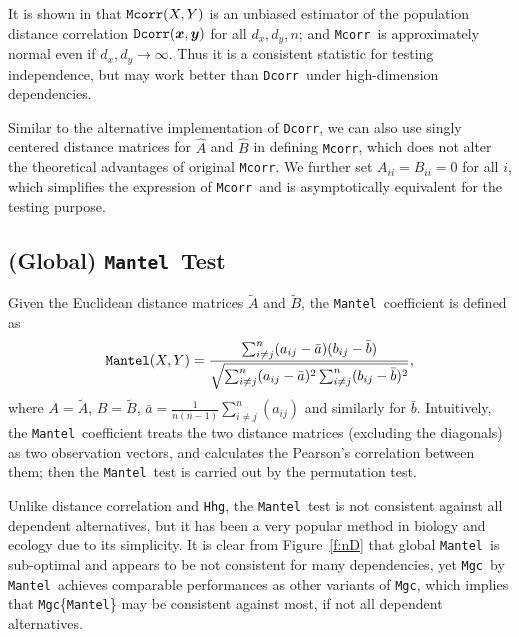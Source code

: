 \documentclass[11pt]{article}
\providecommand{\sct}[1]{{\sc \texttt{#1}}}
\providecommand{\mb}[1]{\boldsymbol{#1}}
\newcommand{\Mgc}{\sct{Mgc}}
\newcommand{\Hhg}{\sct{Hhg}}
\newcommand{\Dcorr}{\sct{Dcorr}}
\newcommand{\Mcorr}{\sct{Mcorr}}
\newcommand{\Mantel}{\sct{Mantel}}
\begin{document}
It is shown in \cite{SzekelyRizzo2013a} that $\Mcorr(X,Y)$ is an unbiased estimator of the population distance correlation $\Dcorr(\mb{x},\mb{y})$ for all $d_{x}, d_{y}, n$; and \Mcorr~is approximately normal even if $d_{x},d_{y} \rightarrow \infty$. Thus it is a consistent statistic for testing independence, but may work better than \Dcorr~under high-dimension dependencies. 

Similar to the alternative implementation of \Dcorr, we can also use singly centered distance matrices for $\hat{A}$ and $\hat{B}$ in defining \Mcorr, which does not alter the theoretical advantages of original \Mcorr. We further set $A_{ii}=B_{ii}=0$ for all $i$, which simplifies the expression of \Mcorr~and is asymptotically equivalent for the testing purpose. %

\subsection{(Global) \Mantel~Test}
\label{appen:mantel}
Given the Euclidean distance matrices $\tilde{A}$ and $\tilde{B}$, the \Mantel~coefficient \cite{Mantel1967} is defined as 
\begin{equation}
\Mantel(X,Y)=\frac{\sum_{i \neq j}^{n}(a_{ij}-\bar{a})(b_{ij}-\bar{b})}{\sqrt{\sum_{i \neq j}^{n}(a_{ij}-\bar{a})^2 \sum_{i \neq j}^{n}(b_{ij}-\bar{b})^2}},
\end{equation}
where $A=\tilde{A}$, $B=\tilde{B}$, $\bar{a}=\frac{1}{n(n-1)}\sum_{i \neq j}^{n}(a_{ij})$ and similarly for $\bar{b}$. Intuitively, the \Mantel~coefficient treats the two distance matrices (excluding the diagonals) as two observation vectors, and calculates the Pearson's correlation between them; then the \Mantel~test is carried out by the permutation test.

Unlike distance correlation and \Hhg, the \Mantel~test is not consistent against all dependent alternatives, but it has been a very popular method in biology and ecology due to its simplicity. It is clear from Figure~\ref{f:nD} that global \Mantel~is sub-optimal and appears to be not consistent for many dependencies, yet \Mgc~by \Mantel~achieves comparable performances as other variants of \Mgc, which implies that \Mgc\{\Mantel\} may be consistent against most, if not all dependent alternatives.
\end{document}
